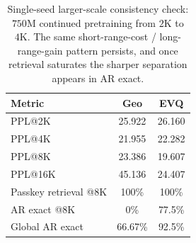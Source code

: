 \begin{table}[t]
\caption{Single-seed larger-scale consistency check: \(750\mathrm{M}\) continued pretraining from \(2\mathrm{K}\) to \(4\mathrm{K}\). The same short-range-cost / long-range-gain pattern persists, and once retrieval saturates the sharper separation appears in AR exact.}
\label{tab:750m-supporting}
\centering
\small
\begin{tabular}{@{}lcc@{}}
\toprule
Metric & Geo & EVQ \\
\midrule
PPL@2K & 25.922 & 26.160 \\
PPL@4K & 21.955 & 22.282 \\
PPL@8K & 23.386 & 19.607 \\
PPL@16K & 45.136 & 24.407 \\
\midrule
Passkey retrieval @8K & 100\% & 100\% \\
AR exact @8K & 0\% & 77.5\% \\
Global AR exact & 66.67\% & 92.5\% \\
\bottomrule
\end{tabular}
\end{table}
